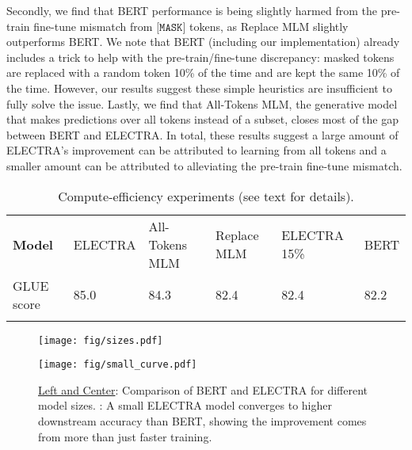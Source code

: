 \documentclass{article}
\newcommand\tstrut{\rule{0pt}{2.6ex}}
\newcommand\bstrut{\rule[-1.0ex]{0pt}{0pt}}
\newcommand{\thinline}{\Xhline{1.5\arrayrulewidth}}
\newcommand{\thickline}{\Xhline{2.5\arrayrulewidth}}
\newcommand{\tsep}	{\bstrut \\ \thinline}
\newcommand{\ttop}{\thickline}
\newcommand{\tbottom}{\bstrut \\ \thickline}
\begin{document}
Secondly, we find that BERT performance is being slightly harmed from the pre-train fine-tune mismatch from $\texttt{[MASK]}$ tokens, as Replace MLM slightly outperforms BERT. 
We note that BERT (including our implementation) already includes a trick to help with the pre-train/fine-tune discrepancy: masked tokens are replaced with a random token 10\% of the time and are kept the same 10\% of the time. However, our results suggest these simple heuristics are insufficient to fully solve the issue. 
Lastly, we find that All-Tokens MLM, the generative model that makes predictions over all tokens instead of a subset, closes most of the gap between BERT and ELECTRA.
In total, these results suggest a large amount of ELECTRA's improvement can be attributed to learning from all tokens and a smaller amount can be attributed to alleviating the pre-train fine-tune mismatch. 
\addtolength{\tabcolsep}{0pt}
\begin{table*}[t!]
\small
\begin{center}
\begin{tabularx}{\linewidth}{X l l l l l}
\ttop
 \textbf{Model} & ELECTRA & All-Tokens MLM & Replace MLM & ELECTRA 15\% & BERT \tstrut \tsep
 GLUE score & 85.0 & 84.3 & 82.4 & 82.4 & 82.2 \tstrut \tbottom
\end{tabularx} 
\end{center}
\vspace{-2mm}
\caption{Compute-efficiency experiments (see text for details).}
\vspace{-1mm}
\label{tab:sample}
\end{table*}
\addtolength{\tabcolsep}{0pt}


\begin{figure}[tb]
\begin{center}
\begin{minipage}[c]{0.61\textwidth}
\texttt{[image: fig/sizes.pdf]}
\end{minipage}
\hspace{6mm}
\begin{minipage}[c]{0.26\textwidth}
\vspace{2mm}
\texttt{[image: fig/small\_curve.pdf]}
\end{minipage}
\end{center}
\caption{\underline{Left and Center}: Comparison of BERT and ELECTRA for different model sizes. \underline{}: A small ELECTRA model converges to higher downstream accuracy than BERT, showing the improvement comes from more than just faster training.}
\label{fig:param}
\end{figure}
\end{document}
